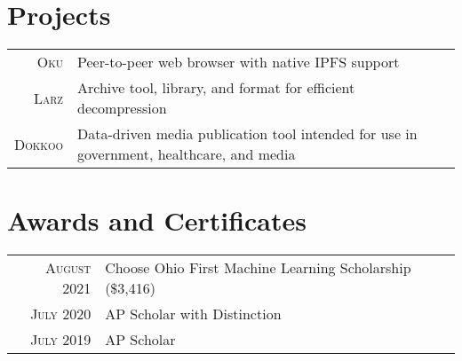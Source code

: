 \documentclass[a4paper,10pt]{article} %
\begin{document}

\section{Projects}

\begin{tabular}{rl}
\textsc{Oku} & Peer-to-peer web browser with native IPFS support\\
\textsc{Larz} & Archive tool, library, and format for efficient decompression\\
\textsc{Dokkoo} & Data-driven media publication tool intended for use in government, healthcare, and media\\
\end{tabular}


\section{Awards and Certificates}

\begin{tabular}{rl}
\textsc{August 2021} & Choose Ohio First Machine Learning Scholarship \footnotesize(\$3,416)\normalsize\\
\textsc{July 2020} & AP Scholar with Distinction\\
\textsc{July 2019} & AP Scholar\\
\end{tabular}




\end{document}
